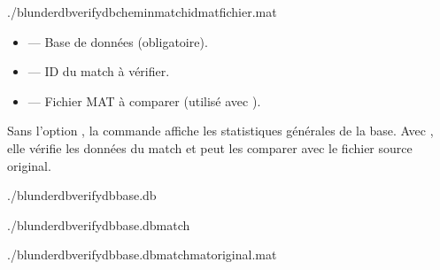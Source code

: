 \documentclass[letterpaper,10pt,french]{sphinxmanual}
\begin{document}
\begin{sphinxVerbatim}[commandchars=\\\{\}]
./blunderdbverify\PYGZhy{}\PYGZhy{}db\PYGZlt{}chemin\PYGZgt{}\PYG{o}{[}\PYGZhy{}\PYGZhy{}match\PYGZlt{}id\PYGZgt{}\PYG{o}{]}\PYG{o}{[}\PYGZhy{}\PYGZhy{}mat\PYGZlt{}fichier.mat\PYGZgt{}\PYG{o}{]}
\end{sphinxVerbatim}

\sphinxAtStartPar
{}
\begin{itemize}
\item {} 
\sphinxAtStartPar
{} — Base de données (obligatoire).

\item {} 
\sphinxAtStartPar
{} — ID du match à vérifier.

\item {} 
\sphinxAtStartPar
{} — Fichier MAT à comparer (utilisé avec ).

\end{itemize}

\sphinxAtStartPar
Sans l’option , la commande affiche les statistiques générales de la
base. Avec , elle vérifie les données du match et peut les comparer
avec le fichier source original.

\sphinxAtStartPar
{}

\begin{sphinxVerbatim}[commandchars=\\\{\}]
./blunderdbverify\PYGZhy{}\PYGZhy{}dbbase.db

./blunderdbverify\PYGZhy{}\PYGZhy{}dbbase.db\PYGZhy{}\PYGZhy{}match

./blunderdbverify\PYGZhy{}\PYGZhy{}dbbase.db\PYGZhy{}\PYGZhy{}match\PYGZhy{}\PYGZhy{}matoriginal.mat
\end{sphinxVerbatim}
\end{document}
